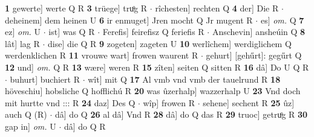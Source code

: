 \documentclass[8pt,a4paper,notitlepage]{article}
\begin{document}
\begin{table}[ht]
\begin{minipage}[t]{0.5\linewidth}
\textbf{1} gewerte] werte Q R \textbf{3} trüege] truͦg R  $\cdot$ rîchesten] rechten Q \textbf{4} der] Die R  $\cdot$ deheinem] dem heinen U \textbf{6} ir enmuget] Jren mocht Q Jr mugent R  $\cdot$ es] \textit{om.} Q \textbf{7} ez] \textit{om.} U  $\cdot$ ist] was Q R  $\cdot$ Ferefis] feirefisz Q feriefis R  $\cdot$ Anschevin] ansheúin Q \textbf{8} lât] lag R  $\cdot$ dise] die Q R \textbf{9} zogeten] zageten U \textbf{10} werlîchem] werdiglichem Q werdenklichen R \textbf{11} vrouwe wart] frowen waurent R  $\cdot$ gehurt] [gehűrt]: gegűrt Q \textbf{12} und] \textit{om.} Q R \textbf{13} wære] weren R \textbf{15} zîten] seiten Q sitten R \textbf{16} dâ] Do U Q R  $\cdot$ buhurt] buchiert R  $\cdot$ wît] mit Q \textbf{17} Al vmb vnd vmb der tauelrund R \textbf{18} höveschiu] hobsliche Q hofflichú R \textbf{20} was ûzerhalp] wazzerhalp U \textbf{23} Vnd doch mit hurtte vnd ::: R \textbf{24} daz] Des Q  $\cdot$ wîp] frowen R  $\cdot$ sehene] sechent R \textbf{25} ûz] auch Q (R)  $\cdot$ dâ] do Q \textbf{26} al dâ] Vnd R \textbf{28} dâ] do Q das R \textbf{29} truoc] getruͦg R \textbf{30} gap in] \textit{om.} U  $\cdot$ dâ] do Q R \newline
\end{minipage}
\end{table}
\end{document}
